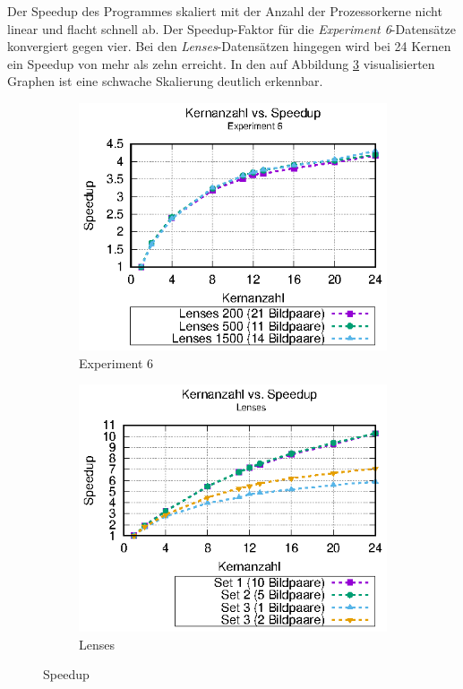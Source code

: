Der Speedup des Programmes skaliert mit der Anzahl der Prozessorkerne nicht linear und flacht schnell ab. Der Speedup-Faktor für die \textit{Experiment 6}-Datensätze konvergiert gegen vier. Bei den \textit{Lenses}-Da\-ten\-sä\-tzen hingegen wird bei 24 Kernen ein Speedup von mehr als zehn erreicht. In den auf Abbildung \ref{fig:speedup} visualisierten Graphen ist eine schwache Skalierung deutlich erkennbar. 

\begin{center}
	\begin{figure}
		\begin{subfigure}[b]{0.49\textwidth}
			\centering
			\includegraphics[width=\textwidth]{pdf/speedup_exp6}
			\caption[Experiment 6]{Experiment 6}
			\label{fig:speedup_exp6}
		\end{subfigure}
		\hfill
		\begin{subfigure}[b]{0.49\textwidth}
			\centering
			\includegraphics[width=\textwidth]{pdf/speedup_lenses}
			\caption[Lenses]{Lenses}
			\label{fig:speedup_lenses}
		\end{subfigure}
		\caption{Speedup}
		\label{fig:speedup}
	\end{figure}
\end{center}

